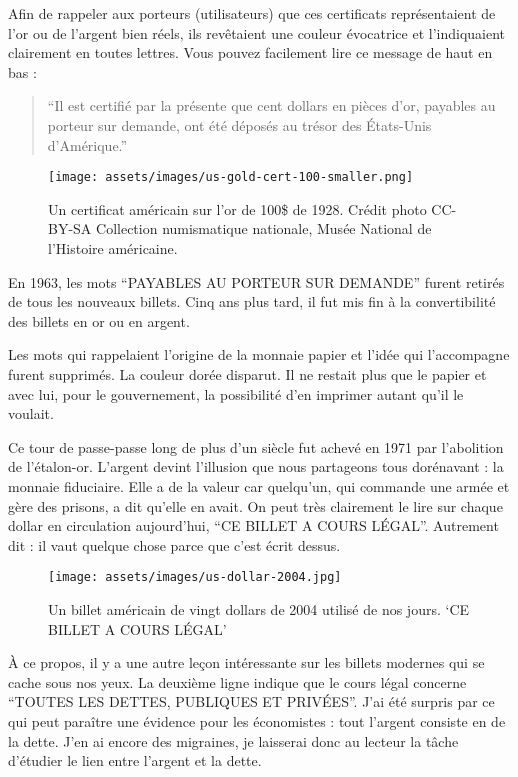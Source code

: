 Afin de rappeler aux porteurs (utilisateurs) que ces certificats représentaient
de l'or ou de l'argent bien réels, ils revêtaient une couleur évocatrice et
l'indiquaient clairement en toutes lettres. Vous pouvez facilement lire ce
message de haut en bas :

\begin{quotation}\begin{samepage}
\enquote{Il est certifié par la présente que cent dollars en pièces d'or,
payables au porteur sur demande, ont été déposés au trésor des États-Unis
d'Amérique.}
\end{samepage}\end{quotation}

\begin{figure}
  \centering
  \texttt{[image: assets/images/us-gold-cert-100-smaller.png]}
  \caption{Un certificat américain sur l'or de 100\$ de 1928. Crédit photo
  CC-BY-SA Collection numismatique nationale, Musée National de l'Histoire
  américaine.}
  \label{fig:us-gold-cert-100-smaller}
\end{figure}

En 1963, les mots \enquote{PAYABLES AU PORTEUR SUR DEMANDE} furent retirés de
tous les nouveaux billets. Cinq ans plus tard, il fut mis fin à la
convertibilité des billets en or ou en argent.

Les mots qui rappelaient l'origine de la monnaie papier et l'idée qui
l'accompagne furent supprimés. La couleur dorée disparut. Il ne restait plus que
le papier et avec lui, pour le gouvernement, la possibilité d'en imprimer autant
qu'il le voulait.

Ce tour de passe-passe long de plus d'un siècle fut achevé en 1971 par
l'abolition de l'étalon-or. L'argent devint l'illusion que nous partageons tous
dorénavant : la monnaie fiduciaire. Elle a de la valeur car quelqu'un, qui
commande une armée et gère des prisons, a dit qu'elle en avait. On peut très
clairement le lire sur chaque dollar en circulation aujourd'hui, \enquote{CE
BILLET A COURS LÉGAL}. Autrement dit : il vaut quelque chose parce que c'est
écrit dessus.

\begin{figure}
  \centering
  \texttt{[image: assets/images/us-dollar-2004.jpg]}
  \caption{Un billet américain de vingt dollars de 2004 utilisé de nos jours.
  `CE BILLET A COURS LÉGAL'}
  \label{fig:us-dollar-2004}
\end{figure}

À ce propos, il y a une autre leçon intéressante sur les billets modernes qui se
cache sous nos yeux. La deuxième ligne indique que le cours légal concerne
\enquote{TOUTES LES DETTES, PUBLIQUES ET PRIVÉES}. J'ai été surpris par ce qui
peut paraître une évidence pour les économistes : tout l'argent consiste en de
la dette. J'en ai encore des migraines, je laisserai donc au lecteur la tâche
d'étudier le lien entre l'argent et la dette.

